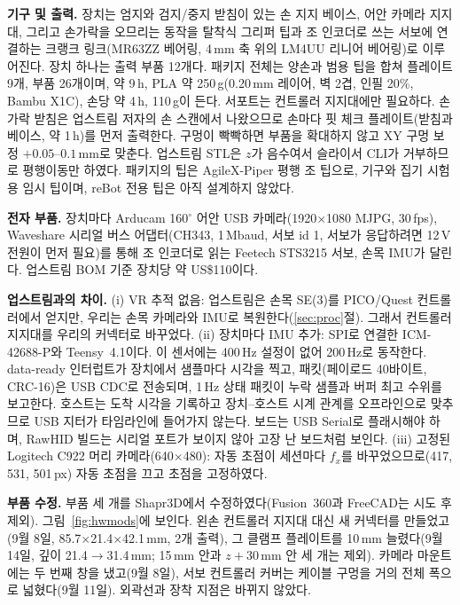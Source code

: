 \documentclass[conference,10pt]{IEEEtran}
\newcommand{\mm}{\,mm\xspace}
\begin{document}
\textbf{기구 및 출력.} 장치는 엄지와 검지/중지 받침이 있는 손 지지 베이스, 어안 카메라 지지대, 그리고 손가락을 오므리는 동작을 탈착식
그리퍼 팁과 조 인코더로 쓰는 서보에 연결하는 크랭크 링크(MR63ZZ 베어링, 4\mm 축 위의 LM4UU 리니어 베어링)로 이루어진다. 장치 하나는
출력 부품 12개다. 패키지 전체는 양손과 범용 팁을 합쳐 플레이트 9개, 부품 26개이며, 약 9\,h, PLA 약 250\,g(0.20\mm 레이어, 벽 2겹,
인필 20\%, Bambu X1C), 손당 약 4\,h, 110\,g이 든다. 서포트는 컨트롤러 지지대에만 필요하다. 손가락 받침은 업스트림 저자의 손 스캔에서
나왔으므로 손마다 핏 체크 플레이트(받침과 베이스, 약 1\,h)를 먼저 출력한다. 구멍이 빡빡하면 부품을 확대하지 않고 XY 구멍 보정
$+0.05$--$0.1$\mm{}로 맞춘다. 업스트림 STL은 $z$가 음수여서 슬라이서 CLI가 거부하므로 평행이동만 하였다. 패키지의 팁은 AgileX-Piper
평행 조 팁으로, 기구와 집기 시험용 임시 팁이며, reBot 전용 팁은 아직 설계하지 않았다.

\textbf{전자 부품.} 장치마다 Arducam 160$^\circ$ 어안 USB 카메라(1920$\times$1080 MJPG, 30\,fps), Waveshare 시리얼 버스 어댑터(CH343,
1\,Mbaud, 서보 id 1, 서보가 응답하려면 12\,V 전원이 먼저 필요)를 통해 조 인코더로 읽는 Feetech STS3215 서보, 손목 IMU가 달린다. 업스트림
BOM 기준 장치당 약 US\$110이다.

\textbf{업스트림과의 차이.} (i) VR 추적 없음: 업스트림은 손목 SE(3)를 PICO/Quest 컨트롤러에서 얻지만, 우리는 손목 카메라와 IMU로
복원한다(\ref{sec:proc}절). 그래서 컨트롤러 지지대를 우리의 커넥터로 바꾸었다. (ii) 장치마다 IMU 추가: SPI로 연결한 ICM-42688-P와
Teensy~4.1이다. 이 센서에는 400\,Hz 설정이 없어 200\,Hz로 동작한다. data-ready 인터럽트가 장치에서 샘플마다 시각을 찍고, 패킷(페이로드
40바이트, CRC-16)은 USB CDC로 전송되며, 1\,Hz 상태 패킷이 누락 샘플과 버퍼 최고 수위를 보고한다. 호스트는 도착 시각을 기록하고
장치--호스트 시계 관계를 오프라인으로 맞추므로 USB 지터가 타임라인에 들어가지 않는다. 보드는 USB Serial로 플래시해야 하며, RawHID
빌드는 시리얼 포트가 보이지 않아 고장 난 보드처럼 보인다. (iii) 고정된 Logitech C922 머리 카메라(640$\times$480): 자동 초점이 세션마다
$f_x$를 바꾸었으므로(417, 531, 501\,px) 자동 초점을 끄고 초점을 고정하였다.

\textbf{부품 수정.} 부품 세 개를 Shapr3D에서 수정하였다(Fusion~360과 FreeCAD는 시도 후 제외). 그림~\ref{fig:hwmods}에 보인다. 왼손
컨트롤러 지지대 대신 새 커넥터를 만들었고(9월 8일, 85.7$\times$21.4$\times$42.1\mm, 2개 출력), 그 클램프 플레이트를 10\mm 늘렸다(9월 14일,
깊이 21.4$\to$31.4\mm; 15\mm 안과 $z{+}30$\mm 안 세 개는 제외). 카메라 마운트에는 두 번째 창을 냈고(9월 8일), 서보 컨트롤러 커버는 케이블
구멍을 거의 전체 폭으로 넓혔다(9월 11일). 외곽선과 장착 지점은 바뀌지 않았다.
\end{document}

